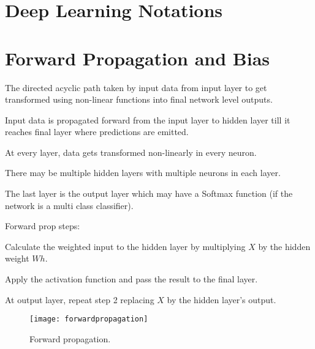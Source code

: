 	\section{Deep Learning Notations}

	\section{Forward Propagation and Bias}
	\begin{bulletedlist}
		\item The directed acyclic path taken by input data from input layer to get transformed using non-linear functions into final network level outputs.
		\item Input data is propagated forward from the input layer to hidden layer till it reaches final layer where predictions are emitted.
		\item At every layer, data gets transformed non-linearly in every neuron.
		\item There may be multiple hidden layers with multiple neurons in each layer.
		\item The last layer is the output layer which may have a Softmax function (if the network is a multi class classifier).
		\item Forward prop steps:
		\begin{numberedlist}
			\item Calculate the weighted input to the hidden layer by multiplying $X$ by the hidden weight $Wh$.
			\item Apply the activation function and pass the result to the final layer.
			\item At output layer, repeat step 2 replacing $X$ by the hidden layer's output.
		\end{numberedlist}
	\end{bulletedlist}
 	\begin{figure}[h]
		\centering
		\texttt{[image: forwardpropagation]}
		\caption[Forward propagation]{Forward propagation.}
		\label{fig:forwardpropagation}
	\end{figure}

